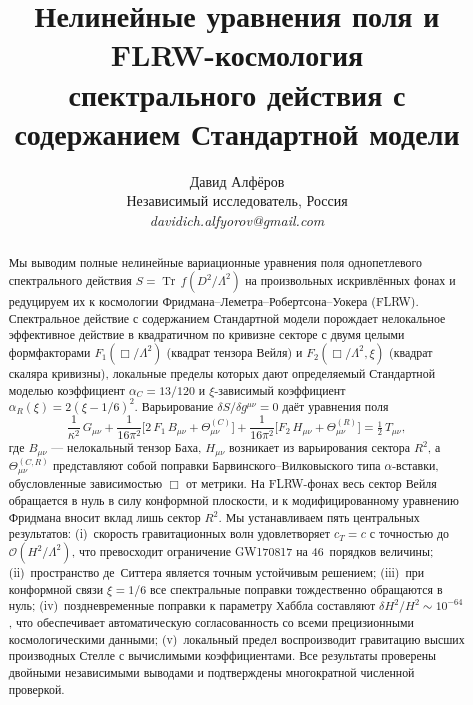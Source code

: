 \documentclass[12pt,a4paper]{article}
\newcommand{\Tr}{\operatorname{Tr}}
\newcommand{\order}{\mathcal{O}}
\newcommand{\Lam}{\Lambda}
\theoremstyle{plain}
\theoremstyle{definition}
\begin{document}
\title{Нелинейные уравнения поля и FLRW-космология\\
спектрального действия с содержанием Стандартной модели}

\author{Давид Алфёров\\[4pt]
\small Независимый исследователь, Россия\\[2pt]
\small\textit{davidich.alfyorov@gmail.com}}

\date{}

\maketitle

\begin{abstract}
Мы выводим полные нелинейные вариационные уравнения поля однопетлевого
спектрального действия $S = \Tr\,f(D^2/\Lam^2)$ на произвольных искривлённых
фонах и редуцируем их к космологии Фридмана--Леметра--Робертсона--Уокера
(FLRW).
Спектральное действие с содержанием Стандартной модели порождает нелокальное
эффективное действие в квадратичном по кривизне секторе с двумя целыми
формфакторами
$F_1(\Box/\Lam^2)$ (квадрат тензора Вейля) и $F_2(\Box/\Lam^2,\xi)$
(квадрат скаляра кривизны), локальные пределы которых дают определяемый
Стандартной моделью коэффициент $\alpha_C = 13/120$ и $\xi$-зависимый
коэффициент $\alpha_R(\xi) = 2(\xi - 1/6)^2$.
Варьирование $\delta S/\delta g^{\mu\nu} = 0$ даёт уравнения поля
\begin{equation*}
  \frac{1}{\kappa^2}\,G_{\mu\nu}
  + \frac{1}{16\pi^2}\bigl[2\,F_1\,B_{\mu\nu}
    + \Theta^{(C)}_{\mu\nu}\bigr]
  + \frac{1}{16\pi^2}\bigl[F_2\,H_{\mu\nu}
    + \Theta^{(R)}_{\mu\nu}\bigr]
  = \tfrac{1}{2}\,T_{\mu\nu},
\end{equation*}
где $B_{\mu\nu}$ --- нелокальный тензор Баха, $H_{\mu\nu}$ возникает из
варьирования сектора $R^2$, а $\Theta^{(C,R)}_{\mu\nu}$ представляют собой
поправки Барвинского--Вилковыского типа $\alpha$-вставки, обусловленные
зависимостью $\Box$ от метрики.
На FLRW-фонах весь сектор Вейля обращается в нуль в силу конформной
плоскости, и к модифицированному уравнению Фридмана вносит вклад лишь
сектор $R^2$.
Мы устанавливаем пять центральных результатов:
(i)~скорость гравитационных волн удовлетворяет $c_T = c$ с точностью до
$\order(H^2/\Lam^2)$, что превосходит ограничение GW170817 на 46~порядков
величины;
(ii)~пространство де~Ситтера является точным устойчивым решением;
(iii)~при конформной связи $\xi = 1/6$ все спектральные поправки
тождественно обращаются в нуль;
(iv)~поздневременные поправки к параметру Хаббла составляют
$\delta H^2/H^2 \sim 10^{-64}$, что обеспечивает автоматическую
согласованность со всеми прецизионными космологическими данными;
(v)~локальный предел воспроизводит гравитацию высших производных Стелле
с вычислимыми коэффициентами.
Все результаты проверены двойными независимыми выводами и подтверждены
многократной численной проверкой.
\end{abstract}
\end{document}

